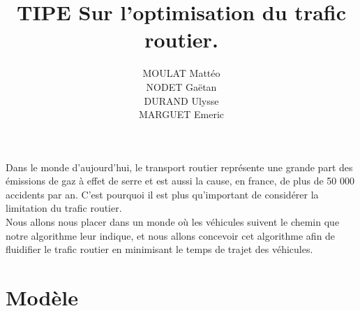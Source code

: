 \documentclass{article}
\title{TIPE Sur l'optimisation du trafic routier.}
\author{MOULAT Mattéo\\NODET Gaëtan\\DURAND Ulysse\\MARGUET Emeric}
\date{}
\begin{document}
\maketitle

Dans le monde d'aujourd'hui, le transport routier représente une grande part des
émissions de gaz à effet de serre et est aussi la cause, en france, de plus de
50 000 accidents par an. C'est pourquoi il est plus qu'important de considérer
la limitation du trafic routier.\\
Nous allons nous placer dans un monde où les véhicules suivent le chemin que
notre algorithme leur indique, et nous allons concevoir cet algorithme afin de
fluidifier le trafic routier en minimisant le temps de trajet des véhicules.


\section{Modèle} 
\end{document}
